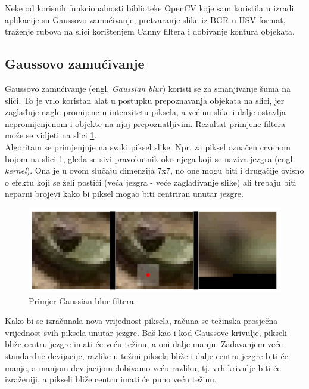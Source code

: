 \documentclass[times, utf8, zavrsni, numeric]{fer}
\begin{document}
Neke od korisnih funkcionalnosti biblioteke OpenCV koje sam koristila u izradi aplikacije su Gaussovo zamućivanje, pretvaranje slike iz BGR u HSV format, traženje rubova na slici korištenjem Canny filtera i dobivanje kontura objekata.

\subsection{Gaussovo zamućivanje}
Gaussovo zamućivanje (engl. \textit{Gaussian blur}) koristi se za smanjivanje šuma na slici. To je vrlo koristan alat u postupku prepoznavanja objekata na slici, jer zaglađuje nagle promijene u intenzitetu piksela, a većinu slike i dalje ostavlja nepromijenjenom i objekte na njoj prepoznatljivim. Rezultat primjene filtera može se vidjeti na slici \ref{fig:gblur}.\\

Algoritam se primjenjuje na svaki piksel slike. Npr. za piksel označen crvenom bojom na slici \ref{fig:gblur}, gleda se sivi pravokutnik oko njega koji se naziva jezgra (engl. \textit{kernel}). Ona je u ovom slučaju dimenzija 7x7, no one mogu biti i drugačije ovisno o efektu koji se želi postići (veća jezgra - veće zaglađivanje slike) ali trebaju biti neparni brojevi kako bi piksel mogao biti centriran unutar jezgre.

\begin{figure}[h]
	\includegraphics[scale=0.5]{gblur.png}
	\centering
	\caption{Primjer Gaussian blur filtera\cite{gauss}}
	\label{fig:gblur}
\end{figure}

Kako bi se izračunala nova vrijednost piksela, računa se težinska prosječna vrijednost svih piksela unutar jezgre. Baš kao i kod Gaussove krivulje, pikseli bliže centru jezgre imati će veću težinu, a oni dalje manju. Zadavanjem veće standardne devijacije, razlike u težini piksela bliže i dalje centru jezgre biti će manje, a manjom devijacijom dobivamo veću razliku, tj. vrh krivulje biti će izraženiji, a pikseli bliže centru imati će puno veću težinu\cite{gauss}.\\
\end{document}

